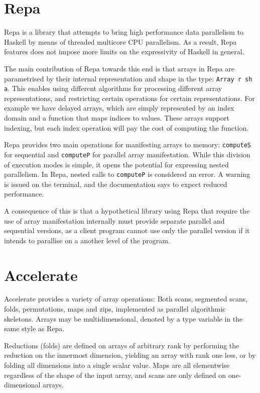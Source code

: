 \section{Repa}

Repa is a library that attempts to bring high performance data parallelism to
Haskell by means of threaded multicore CPU parallelism. As a result, Repa
features does not impose more limits on the expressivity of Haskell in general.

The main contribution of Repa towards this end is that arrays in Repa are
parametrised by their internal representation and shape in the type:
\texttt{Array r sh a}.  This enables using different algorithms for processing
different array representations, and restricting certain operations for certain
representations. For example we have delayed arrays, which are simply
represented by an index domain and a function that maps indices to values.
These arrays support indexing, but each index operation will pay the cost of
computing the function.

Repa provides two main operations for manifesting arrays to memory:
\texttt{computeS} for sequential and \texttt{computeP} for parallel array
manifestation. While this division of execution modes is simple, it opens the
potential for expressing nested parallelism. In Repa, nested calls to
\texttt{computeP} is considered an error. A warning is issued on the terminal,
and the documentation says to expect reduced performance.

A consequence of this is that a hypothetical library using Repa that require
the use of array manifestation internally must provide separate parallel and
sequential versions, as a client program cannot use only the parallel version
if it intends to parallise on a another level of the program.

\section{Accelerate}
\label{sec:language-discussion-accelerate}
Accelerate provides a variety of array operations: Both scans,
segmented scans, folds, permutations, maps and zips, implemented as
parallel algorithmic skeletons. Arrays may be multidimensional,
denoted by a type variable in the same style as Repa.

Reductions (folds) are defined on arrays of arbitrary rank by
performing the reduction on the innermost dimension, yielding an array
with rank one less, or by folding all dimensions into a single scalar
value.  Maps are all elementwise regardless of the shape of the input
array, and scans are only defined on one-dimensional arrays.

